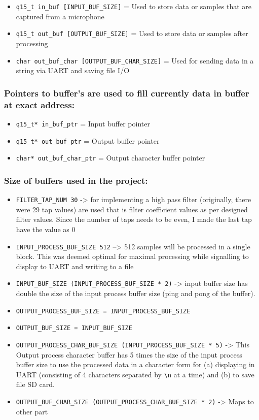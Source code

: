 \documentclass[11pt]{article}
\begin{document}
\begin{itemize}
\item \texttt{q15\_t in\_buf [INPUT\_BUF\_SIZE]} = Used to store data or samples that are captured from a microphone
\item \texttt{q15\_t out\_buf [OUTPUT\_BUF\_SIZE]} = Used to store data or samples after processing
\item \texttt{char out\_buf\_char [OUTPUT\_BUF\_CHAR\_SIZE]} = Used for sending data in a string via UART and saving file I/O
\end{itemize}

\subsubsection*{Pointers to buffer's are used to fill currently data in buffer at exact address:}
\label{sec:orgbbc408a}

\begin{itemize}
\item \texttt{q15\_t* in\_buf\_ptr} = Input buffer pointer
\item \texttt{q15\_t* out\_buf\_ptr} = Output buffer pointer
\item \texttt{char* out\_buf\_char\_ptr} = Output character buffer pointer
\end{itemize}

\subsubsection*{Size of buffers used in the project:}
\label{sec:org25d44eb}
\begin{itemize}
\item \texttt{FILTER\_TAP\_NUM 30} -> for implementing a high pass filter (originally, there were 29 tap values) are used that is filter coefficient values as per designed filter values. Since the number of taps needs to be even, I made the last tap have the value as 0
\item \texttt{INPUT\_PROCESS\_BUF\_SIZE 512} –> 512 samples will be processed in a single block. This was deemed optimal for maximal processing while signalling to display to UART and writing to a file
\item \texttt{INPUT\_BUF\_SIZE (INPUT\_PROCESS\_BUF\_SIZE * 2)} -> input buffer size has double the size of the input process buffer size (ping and pong of the buffer).
\item \texttt{OUTPUT\_PROCESS\_BUF\_SIZE = INPUT\_PROCESS\_BUF\_SIZE}
\item \texttt{OUTPUT\_BUF\_SIZE = INPUT\_BUF\_SIZE}
\item \texttt{OUTPUT\_PROCESS\_CHAR\_BUF\_SIZE (INPUT\_PROCESS\_BUF\_SIZE * 5)} -> This Output process character buffer has 5 times the size of the input process buffer size to use the processed data in a character form for (a) displaying in UART (consisting of 4 characters separated by \texttt{\textbackslash{}n} at a time) and (b) to save file SD card.
\item \texttt{OUTPUT\_BUF\_CHAR\_SIZE (OUTPUT\_PROCESS\_CHAR\_BUF\_SIZE * 2)} -> Maps to other part
\end{itemize}
\end{document}
